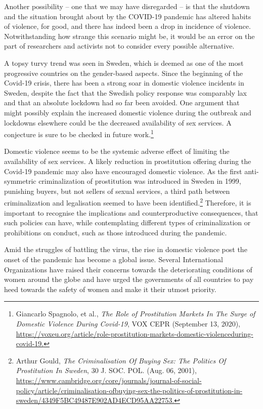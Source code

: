 \begin{multicols}{2}
\noi
Another possibility – one that we may have disregarded – is that the shutdown and the
situation brought about by the COVID-19 pandemic has altered habits of violence, for good,
and there has indeed been a drop in incidence of violence. Notwithstanding how strange this
scenario might be, it would be an error on the part of researchers and activists not to consider
every possible alternative.

\noi
A topsy turvy trend was seen in Sweden, which is deemed as one of the most progressive
countries on the gender-based aspects. Since the beginning of the Covid-19 crisis, there has
been a strong soar in domestic violence incidents in Sweden, despite the fact that the Swedish
policy response was comparably lax and that an absolute lockdown had so far been avoided.
One argument that might possibly explain the increased domestic violence during the outbreak and lockdowns elsewhere could be the decreased availability of sex services. A
conjecture is sure to be checked in future work.\footnote{Giancarlo Spagnolo, et al., \textit{The Role of Prostitution Markets In The Surge of Domestic Violence During Covid-19}, VOX CEPR (September 13, 2020), \url{https://voxeu.org/article/role-prostitution-markets-domestic-violenceduring-covid-19.}}

\noi
Domestic violence seems to be the systemic adverse effect of limiting the availability of sex
services. A likely reduction in prostitution offering during the Covid-19 pandemic may also
have encouraged domestic violence. As the first anti-symmetric criminalization of
prostitution was introduced in Sweden in 1999, punishing buyers, but not sellers of sexual
services, a third path between criminalization and legalisation seemed to have been
identified.\footnote{Arthur Gould, \textit{The Criminalisation Of Buying Sex: The Politics Of Prostitution In Sweden}, 30 J. SOC. POL.
(Aug. 06, 2001),\\ \url{https://www.cambridge.org/core/journals/journal-of-social-policy/article/criminalisation-ofbuying-sex-the-politics-of-prostitution-in-sweden/4349F5BC49487E902AD4ECD95AA22753.}} Therefore, it is important to recognise the implications and counterproductive
consequences, that such policies can have, while contemplating different types of
criminalization or prohibitions on conduct, such as those introduced during the pandemic.


\noi
Amid the struggles of battling the virus, the rise in domestic violence post the onset of the
pandemic has become a global issue. Several International Organizations have raised their
concerns towards the deteriorating conditions of women around the globe and have urged the
governments of all countries to pay heed towards the safety of women and make it their
utmost priority.


\end{multicols}
